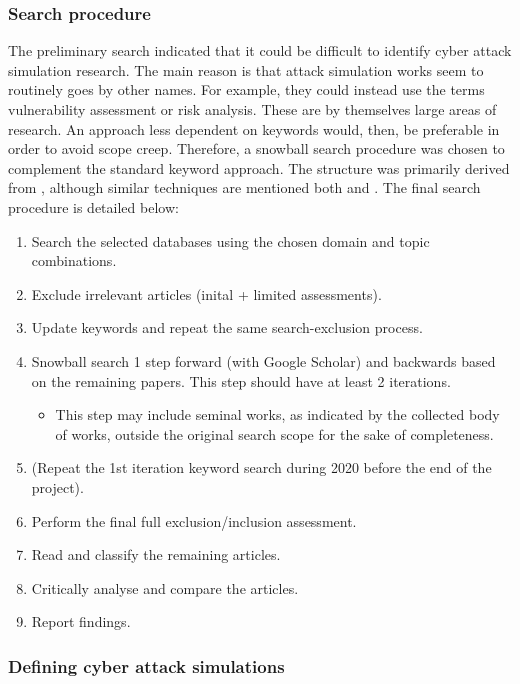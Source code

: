 \documentclass{article}
\begin{document}
\subsubsection{Search procedure}

The preliminary search indicated that it could be difficult to identify cyber attack simulation research. The main reason is that attack simulation works seem to routinely goes by other names. For example, they could instead use the terms vulnerability assessment or risk analysis. These are by themselves large areas of research. An approach less dependent on keywords would, then, be preferable in order to avoid scope creep. Therefore, a snowball search procedure was chosen to complement the standard keyword approach. The structure was primarily derived from \cite{webster2002}, although similar techniques are mentioned both \cite[pp.~78-79]{booth2012} and \cite[p~20]{okoli2010}. The final search procedure is detailed below:

\begin{enumerate}
    \item Search the selected databases using the chosen domain and topic combinations.
    \item Exclude irrelevant articles (inital + limited assessments).
    \item Update keywords and repeat the same search-exclusion process.
    \item Snowball search 1 step forward (with Google Scholar) and backwards based on the remaining papers. This step should have at least 2 iterations.
    \begin{itemize}
        \item This step may include seminal works, as indicated by the collected body of works, outside the original search scope for the sake of completeness.
    \end{itemize}
    \item (Repeat the 1st iteration keyword search during 2020 before the end of the project).
    \item Perform the final full exclusion/inclusion assessment.
    \item Read and classify the remaining articles.
    \item Critically analyse and compare the articles.
    \item Report findings.
\end{enumerate}

\subsubsection{Defining cyber attack simulations}
\end{document}
